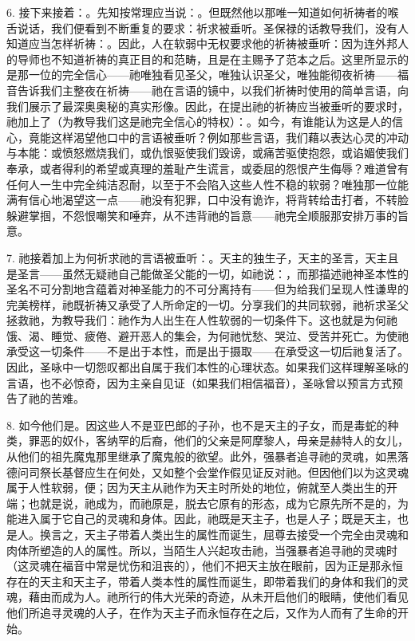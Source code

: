 6. 接下来接着：。先知按常理应当说：。但既然他以那唯一知道如何祈祷者的喉舌说话，我们便看到不断重复的要求：祈求被垂听。圣保禄的话教导我们，没有人知道应当怎样祈祷：。因此，人在软弱中无权要求他的祈祷被垂听：因为连外邦人的导师也不知道祈祷的真正目的和范畴，且是在主赐予了范本之后。这里所显示的是那一位的完全信心——祂唯独看见圣父，唯独认识圣父，唯独能彻夜祈祷——福音告诉我们主整夜在祈祷——祂在言语的镜中，以我们祈祷时使用的简单言语，向我们展示了最深奥奥秘的真实形像。因此，在提出祂的祈祷应当被垂听的要求时，祂加上了（为教导我们这是祂完全信心的特权）：。如今，有谁能认为这是人的信心，竟能这样渴望他口中的言语被垂听？例如那些言语，我们藉以表达心灵的冲动与本能：或愤怒燃烧我们，或仇恨驱使我们毁谤，或痛苦驱使抱怨，或谄媚使我们奉承，或者得利的希望或真理的羞耻产生谎言，或委屈的怨恨产生侮辱？难道曾有任何人一生中完全纯洁忍耐，以至于不会陷入这些人性不稳的软弱？唯独那一位能满有信心地渴望这一点——祂没有犯罪，口中没有诡诈，将背转给击打者，不转脸躲避掌掴，不怨恨嘲笑和唾弃，从不违背祂的旨意——祂完全顺服那安排万事的旨意。\par

7. 祂接着加上为何祈求祂的言语被垂听：。天主的独生子，天主的圣言，天主且是圣言——虽然无疑祂自己能做圣父能的一切，如祂说：，而那描述祂神圣本性的圣名不可分割地含蕴着对神圣能力的不可分离持有——但为给我们呈现人性谦卑的完美榜样，祂既祈祷又承受了人所命定的一切。分享我们的共同软弱，祂祈求圣父拯救祂，为教导我们：祂作为人出生在人性软弱的一切条件下。这也就是为何祂饿、渴、睡觉、疲倦、避开恶人的集会，为何祂忧愁、哭泣、受苦并死亡。为使祂承受这一切条件——不是出于本性，而是出于摄取——在承受这一切后祂复活了。因此，圣咏中一切怨叹都出自属于我们本性的心理状态。如果我们这样理解圣咏的言语，也不必惊奇，因为主亲自见证（如果我们相信福音），圣咏曾以预言方式预告了祂的苦难。\par

8. 如今他们是。因这些人不是亚巴郎的子孙，也不是天主的子女，而是毒蛇的种类，罪恶的奴仆，客纳罕的后裔，他们的父亲是阿摩黎人，母亲是赫特人的女儿，从他们的祖先魔鬼那里继承了魔鬼般的欲望。此外，强暴者追寻祂的灵魂，如黑落德问司祭长基督应生在何处，又如整个会堂作假见证反对祂。但因他们以为这灵魂属于人性软弱，便；因为天主从祂作为天主时所处的地位，俯就至人类出生的开端；也就是说，祂成为，而祂原是，脱去它原有的形态，成为它原先所不是的，为能进入属于它自己的灵魂和身体。因此，祂既是天主子，也是人子；既是天主，也是人。换言之，天主子带着人类出生的属性而诞生，屈尊去接受一个完全由灵魂和肉体所塑造的人的属性。所以，当陌生人兴起攻击祂，当强暴者追寻祂的灵魂时（这灵魂在福音中常是忧伤和沮丧的），他们不把天主放在眼前，因为正是那永恒存在的天主和天主子，带着人类本性的属性而诞生，即带着我们的身体和我们的灵魂，藉由而成为人。祂所行的伟大光荣的奇迹，从未开启他们的眼睛，使他们看见他们所追寻灵魂的人子，在作为天主子而永恒存在之后，又作为人而有了生命的开始。\par

